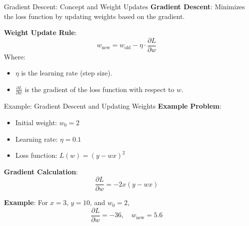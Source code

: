 \documentclass[serif, aspectratio=169]{beamer}
\begin{document}
\begin{frame}{Gradient Descent: Concept and Weight Updates}
    \textbf{Gradient Descent}: Minimizes the loss function by updating weights based on the gradient.

    \textbf{Weight Update Rule}:
    \[
    w_{\text{new}} = w_{\text{old}} - \eta \cdot \frac{\partial L}{\partial w}
    \]
    Where:
    \begin{itemize}
        \item \( \eta \) is the learning rate (step size).
        \item \( \frac{\partial L}{\partial w} \) is the gradient of the loss function with respect to \( w \).
    \end{itemize}
\end{frame}

\begin{frame}{Example: Gradient Descent and Updating Weights}
    \textbf{Example Problem}:
    \begin{itemize}
        \item Initial weight: \( w_0 = 2 \)
        \item Learning rate: \( \eta = 0.1 \)
        \item Loss function: \( L(w) = (y - wx)^2 \)
    \end{itemize}
    
    \textbf{Gradient Calculation}:
    \[
    \frac{\partial L}{\partial w} = -2x(y - wx)
    \]
    
    \textbf{Example}: For \( x = 3 \), \( y = 10 \), and \( w_0 = 2 \),
    \[
    \frac{\partial L}{\partial w} = -36, \quad w_{\text{new}} = 5.6
    \]
\end{frame}
\end{document}
